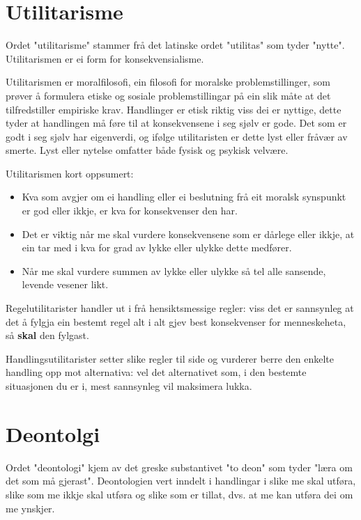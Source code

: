 \documentclass[a4paper]{IEEEtran}
\begin{document}
\bigskip
\section{Utilitarisme}
\label{utilitarisme}\bigskip

Ordet "utilitarisme" stammer frå det latinske ordet "utilitas" som tyder "nytte". Utilitarismen er ei form for konsekvensialisme.\bigskip


Utilitarismen er moralfilosofi, ein filosofi for moralske problemstillinger, som prøver å formulera etiske og sosiale problemstillingar på ein slik måte at det tilfredstiller empiriske krav. Handlinger er etisk riktig viss dei er nyttige, dette tyder at handlingen må føre til at konsekvensene i seg sjølv er gode. Det som er godt i seg sjølv har eigenverdi, og ifølge utilitaristen er dette lyst eller fråvær av smerte. Lyst eller nytelse omfatter både fysisk og psykisk velvære.\bigskip
 


Utilitarismen kort oppsumert:\bigskip
\begin{itemize}
    \item Kva som avgjer om ei handling eller ei beslutning frå eit moralsk synspunkt er god eller ikkje, er kva for konsekvenser den har.
    \item Det er viktig når me skal vurdere konsekvensene som er dårlege eller ikkje, at ein tar med i kva for grad av lykke eller ulykke dette medfører.
    \item Når me skal vurdere summen av lykke eller ulykke så tel alle sansende, levende vesener likt. 
\end{itemize}\bigskip

Regelutilitarister handler ut i frå hensiktsmessige regler: viss det er sannsynleg at det å fylgja ein bestemt regel alt i alt gjev best konsekvenser for menneskeheta, så \textbf{skal} den fylgast.\bigskip

Handlingsutilitarister setter slike regler til side og vurderer berre den enkelte handling opp mot alternativa: vel det alternativet som, i den bestemte situasjonen du er i, mest sannsynleg vil maksimera lukka.

\bigskip
\section{Deontolgi}
\label{deontologi}\bigskip

Ordet "deontologi" kjem av det greske substantivet "to deon" som tyder "læra om det som må gjerast". Deontologien vert inndelt i handlingar i slike me skal utføra, slike som me ikkje skal utføra og slike som er tillat, dvs. at me kan utføra dei om me ynskjer.\bigskip
\end{document}
